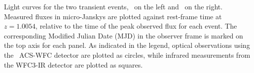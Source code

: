 \label{fig:LightCurves}
Light curves for the two transient events, \spockone\ on the left
and \spocktwo\ on the right.  Measured fluxes in micro-Janskys are
plotted against rest-frame time at $z=1.0054$, relative to the time of
the peak observed flux for each event. The corresponding Modified
Julian Date (MJD) in the observer frame is marked on the top axis for
each panel.  As indicated in the legend, optical observations using
the \HST\ ACS-WFC detector are plotted as circles, while infrared
measurements from the WFC3-IR detector are plotted as squares.

  
